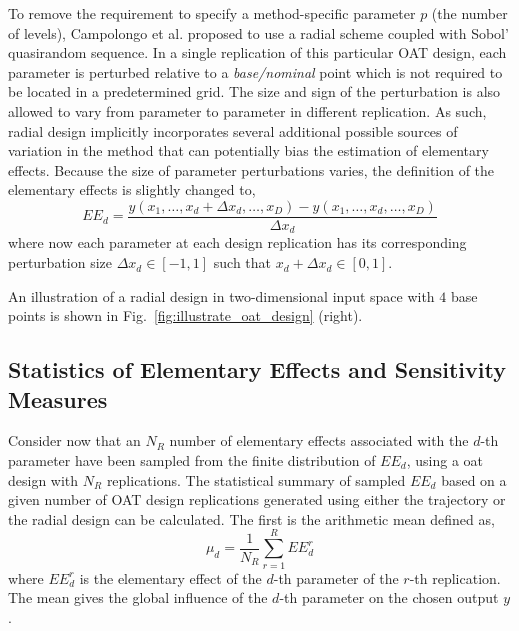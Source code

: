 To remove the requirement to specify a method-specific parameter $p$ (the number of levels),
Campolongo et al.\cite{Campolongo2011} proposed to use a radial scheme coupled with Sobol' quasirandom sequence.
In a single replication of this particular OAT design, 
each parameter is perturbed relative to a \textit{base/nominal} point 
which is not required to be located in a predetermined grid.
The size and sign of the perturbation is also allowed to vary from parameter to parameter in different replication.
As such, radial design implicitly incorporates several additional possible sources of variation in the method 
that can potentially bias the estimation of elementary effects.
Because the size of parameter perturbations varies, the definition of the elementary effects is slightly changed to,
\begin{equation}
EE_d = \frac{y(x_1, \dots, x_d+\Delta x_d,\dots,x_D) - y(x_1, \dots, x_d,\dots,x_D)}{\Delta x_d}
\end{equation}
where now each parameter at each design replication has its corresponding perturbation size $\Delta x_d \in [-1,1]$ such that $x_d + \Delta x_d \in [0,1]$.

An illustration of a radial design in two-dimensional input space with $4$ base points is shown in Fig.~\ref{fig:illustrate_oat_design} (right).
 
\subsection{Statistics of Elementary Effects and Sensitivity Measures}

Consider now that an $N_R$ number of elementary effects associated with the $d$-th parameter have been sampled from the finite distribution of $EE_d$,
using a \gls{oat} design with $N_R$ replications.
The statistical summary of sampled $EE_d$ based on a given number of OAT design replications generated using either the trajectory or the radial design can be calculated.
The first is the arithmetic mean defined as,
\begin{equation}
	\mu_d = \frac{1}{N_R} \sum_{r = 1}^{R} EE^r_d
	\label{eq:sa_morris_mu}
\end{equation} 
where $EE^r_d$ is the elementary effect of the $d$-th parameter of the $r$-th replication.
The mean gives the global influence of the $d$-th parameter on the chosen output $y$.

